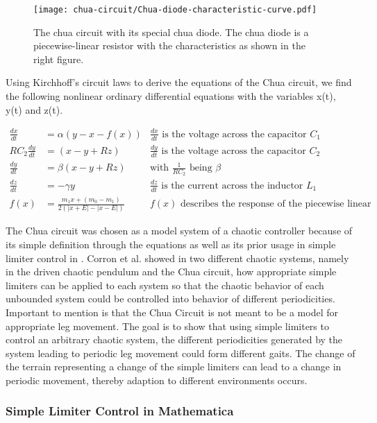 \documentclass[main]{subfiles}
\begin{document}
\begin{figure}[H]
\centering

\texttt{[image: chua-circuit/Chua-diode-characteristic-curve.pdf]}
\caption[The chua circuit]{The chua circuit with its special chua diode. The chua diode is a piecewise-linear resistor with the characteristics as shown in the right figure.}
\label{figure:chuacircuit}
\end{figure}

Using Kirchhoff's circuit laws to derive the equations of the Chua circuit, we find the following nonlinear ordinary differential equations with the variables x(t), y(t) and z(t).

\begin{align*}
\frac{dx}{dt}&=\alpha (y-x-f(x)) &\frac{dx}{dt}\text{ is the voltage across the capacitor }C_1\\
RC_2\frac{dy}{dt}&= (x-y+Rz) &\frac{dy}{dt}\text{ is the voltage across the capacitor }C_2\\
\frac{dy}{dt}&=\beta (x-y+Rz) &\text{with } \frac{1}{RC_2} \text{ being }\beta\\
\frac{dz}{dt}&=-\gamma y &\frac{dz}{dt}\text{ is the current across the inductor }L_1\\
f (x) &= \frac{m_1 x + (m_0 - m_1)}{2 (| x + E | -| x - E |)} &f(x)\text{ describes the response of the piecewise linear resistor}
\end{align*}

The Chua circuit was chosen as a model system of a chaotic controller because of its simple definition through the equations as well as its prior usage in simple limiter control in \cite{bib:Corron2000}. %
%
Corron et al. showed in two different chaotic systems, namely in the driven chaotic pendulum and the Chua circuit, how appropriate simple limiters can be applied to each system so that the chaotic behavior of each unbounded system could be controlled into behavior of different periodicities. %
%
Important to mention is that the Chua Circuit is not meant to be a model for appropriate leg movement. %
%
The goal is to show that using simple limiters to control an arbitrary chaotic system, the different periodicities generated by the system leading to periodic leg movement could form different gaits. %
%
The change of the terrain representing a change of the simple limiters can lead to a change in periodic movement, thereby adaption to different environments occurs. 

\subsubsection{Simple Limiter Control in Mathematica}
\label{subsubsec:simple-limiter-mathematica}
\end{document}
